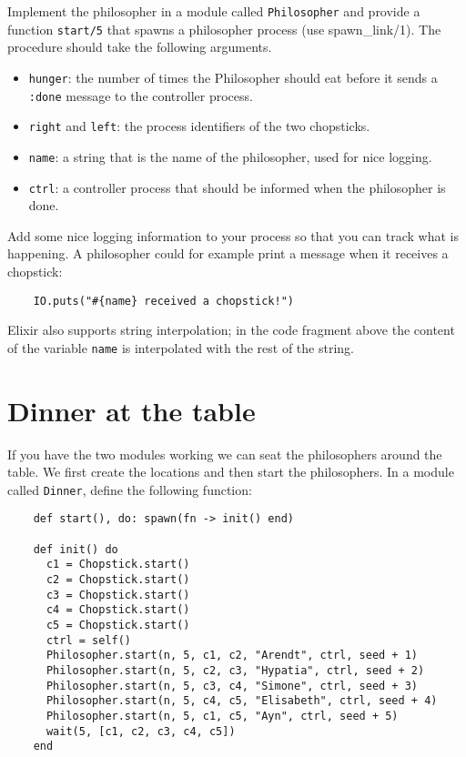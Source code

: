 \documentclass[a4paper,11pt]{article}
\begin{document}
    Implement the philosopher in a module called {\tt Philosopher} and
    provide a function {\tt start/5} that spawns a philosopher
    process (use spawn\_link/1). The procedure should take the following arguments.
    
    \begin{itemize}
    
    \item {\tt hunger}: the number of times the Philosopher should eat
      before it sends a {\tt :done} message to the controller process.
    
    \item {\tt right} and {\tt left}: the process identifiers of the two
      chopsticks.
    
    \item {\tt name}: a string that is the name of the philosopher, used
      for nice logging.
    
    \item {\tt ctrl}: a controller process that should be informed when
      the philosopher is done.
    \end{itemize}
    
    Add some nice logging information to your process so that you can
    track what is happening. A philosopher could for example print a
    message when it receives a chopstick:
    
    \begin{verbatim}
    IO.puts("#{name} received a chopstick!")
    \end{verbatim}
    
    Elixir also supports string interpolation; in the code fragment above the content of the variable {\tt name} is interpolated with the rest of the string.
    
    
    
    \section{Dinner at the table}
    
    If you have the two modules working we can seat the philosophers
    around the table. We first create the locations and then start the
    philosophers. In a module called {\tt Dinner}, define the following
    function:
    
    \begin{verbatim}
    def start(), do: spawn(fn -> init() end)
    
    def init() do
      c1 = Chopstick.start()    
      c2 = Chopstick.start()
      c3 = Chopstick.start()
      c4 = Chopstick.start()
      c5 = Chopstick.start()
      ctrl = self()
      Philosopher.start(n, 5, c1, c2, "Arendt", ctrl, seed + 1)
      Philosopher.start(n, 5, c2, c3, "Hypatia", ctrl, seed + 2)
      Philosopher.start(n, 5, c3, c4, "Simone", ctrl, seed + 3)
      Philosopher.start(n, 5, c4, c5, "Elisabeth", ctrl, seed + 4)
      Philosopher.start(n, 5, c1, c5, "Ayn", ctrl, seed + 5)
      wait(5, [c1, c2, c3, c4, c5])
    end
    \end{verbatim}
    
\end{document}
